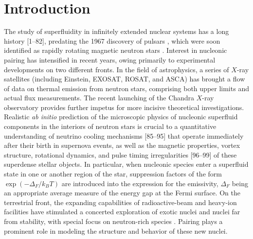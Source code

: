 \section{Introduction \label{sec:intro}}
The study of superfluidity in infinitely extended nuclear systems has a 
long history [1--82], predating the 1967 discovery of pulsars \cite{hewish}, 
which were soon identified as rapidly rotating magnetic neutron 
stars \cite{gold}.  Interest in nucleonic pairing has intensified 
in recent years, owing primarily to experimental developments on two 
different fronts.  In the field of astrophysics, a series of $X$-ray 
satellites (including Einstein, EXOSAT, ROSAT, and ASCA) has brought a 
flow of data on thermal emission from neutron stars, comprising both upper 
limits and actual flux measurements.  The recent launching of the 
Chandra $X$-ray observatory provides further impetus for more incisive 
theoretical investigations.  Realistic {\it ab initio} prediction of the 
microscopic physics of nucleonic superfluid components in the interiors 
of neutron stars is crucial to a quantitative understanding of neutrino 
cooling mechanisms [85--95] that operate immediately after their birth 
in supernova events, as well as the magnetic properties, vortex structure, 
rotational dynamics, and pulse timing irregularities [96--99] of these 
superdense stellar objects.  In particular, when nucleonic species enter 
a superfluid state in one or another region of the star, suppression 
factors of the form $\exp (-\Delta_F /k_B T)$ are introduced 
into the expression for the emissivity, $\Delta_F$ being an appropriate 
average measure of the energy gap at the Fermi surface.  On the terrestrial 
front, the expanding capabilities of radioactive-beam and heavy-ion 
facilities have stimulated a concerted exploration of exotic nuclei and 
nuclei far from stability, with special focus on neutron-rich species 
\cite{riisager,mueller}.  Pairing plays a prominent role in modeling 
the structure and behavior of these new nuclei.  

